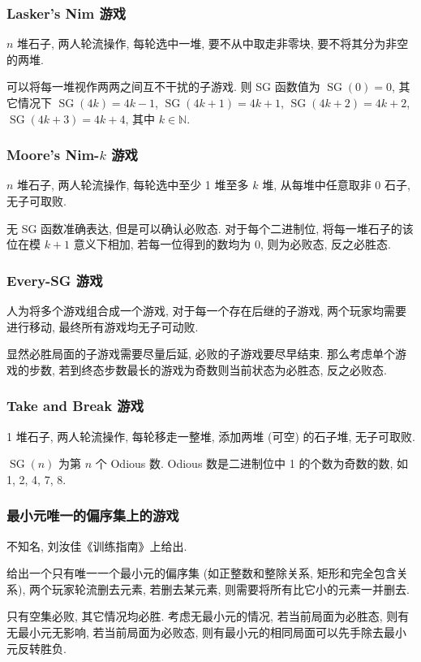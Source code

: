\subsubsection{Lasker's Nim 游戏}
$n$ 堆石子, 两人轮流操作, 每轮选中一堆, 要不从中取走非零块, 要不将其分为非空的两堆.

可以将每一堆视作两两之间互不干扰的子游戏. 则 SG 函数值为 $\operatorname{SG}(0)=0$, 其它情况下 $\operatorname{SG}(4k)=4k-1$, $\operatorname{SG}(4k+1)=4k+1$, $\operatorname{SG}(4k+2)=4k+2$, $\operatorname{SG}(4k+3)=4k+4$, 其中 $k\in\mathbb N$.

\subsubsection{Moore's Nim-\(k\) 游戏}
$n$ 堆石子, 两人轮流操作, 每轮选中至少 1 堆至多 $k$ 堆, 从每堆中任意取非 0 石子, 无子可取败.

无 SG 函数准确表达, 但是可以确认必败态. 对于每个二进制位, 将每一堆石子的该位在模 $k+1$ 意义下相加, 若每一位得到的数均为 0, 则为必败态, 反之必胜态.

\subsubsection{Every-SG 游戏}
人为将多个游戏组合成一个游戏, 对于每一个存在后继的子游戏, 两个玩家均需要进行移动, 最终所有游戏均无子可动败.

显然必胜局面的子游戏需要尽量后延, 必败的子游戏要尽早结束. 那么考虑单个游戏的步数, 若到终态步数最长的游戏为奇数则当前状态为必胜态, 反之必败态.

\subsubsection{Take and Break 游戏}
1 堆石子, 两人轮流操作, 每轮移走一整堆, 添加两堆 (可空) 的石子堆, 无子可取败.

$\operatorname{SG}(n)$ 为第 $n$ 个 Odious 数. Odious 数是二进制位中 1 的个数为奇数的数, 如 1, 2, 4, 7, 8.

\subsubsection{最小元唯一的偏序集上的游戏}
不知名, 刘汝佳《训练指南》上给出.

给出一个只有唯一一个最小元的偏序集 (如正整数和整除关系, 矩形和完全包含关系), 两个玩家轮流删去元素, 若删去某元素, 则需要将所有比它小的元素一并删去.

只有空集必败, 其它情况均必胜. 考虑无最小元的情况, 若当前局面为必胜态, 则有无最小元无影响, 若当前局面为必败态, 则有最小元的相同局面可以先手除去最小元反转胜负.

